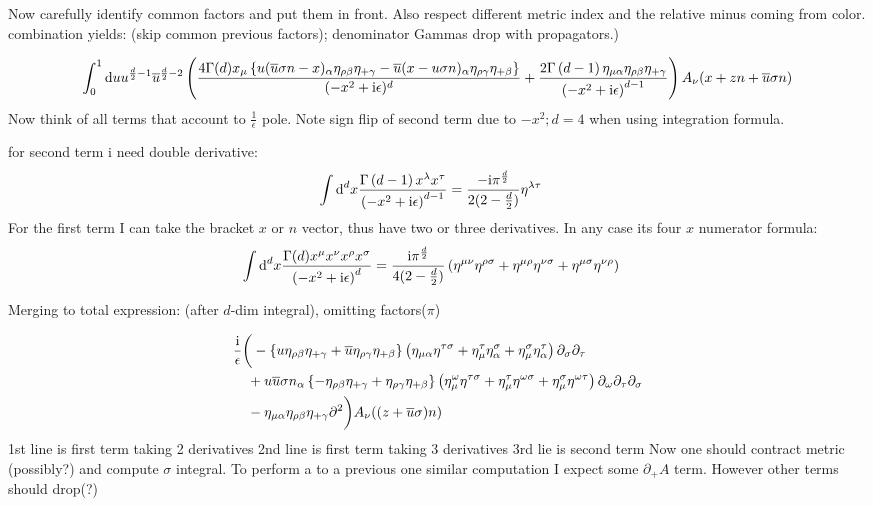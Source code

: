 Now carefully identify common factors and put them in front. Also respect different metric index and the relative minus coming from color. combination yields: (skip common previous factors); denominator Gammas drop with propagators.)


\begin{align}
	\int_{0}^{1} \text{d} u u^{\frac{d}{2}-1} \overline u^{\frac{d}{2}-2} \left( \frac{4\Gamma(d)x_\mu\left\{u (\overline u \sigma n -x )_\alpha \eta_{\rho\beta} \eta_{+\gamma} -\overline u (x - u\sigma n)_\alpha \eta_{\rho \gamma}\eta_{+\beta} \right\}}{(-x^2+\text{i}\epsilon)^{d}} +\frac{2\Gamma\left( d-1 \right) \eta_{\mu \alpha} \eta_{\rho \beta}\eta_{+\gamma} }{\left(-x^2+\text{i} \epsilon\right)^{d-1}}\right)A_{\nu}(x+zn+\overline u \sigma n)
\end{align}
Now think of all terms that account to $\frac{1}{\epsilon}$ pole. Note sign flip of second term due to $-x^2; d=4$ when using integration formula. 

for second term i need double derivative:
\begin{align}
	\int \text{d} ^d  x \frac{\Gamma\left( d-1 \right) x^\lambda x^\tau}{\left(-x^2+\text{i} \epsilon\right)^{d-1}}
	&=
	\frac{-\text{i} \pi^{\frac{d}{2}}}{2(2-\frac{d}{2})}\eta^{\lambda\tau}
\end{align}
For the first term I can take the bracket $x$ or $n$ vector, thus have two or three derivatives. In any case its four $x$ numerator formula:
\begin{align}
	\int \text{d} ^d  x \frac{\Gamma(d)x^\mu x^\nu x^\rho x^\sigma}{\left(-x^2+\text{i} \epsilon\right)^{d}}
	&=
	\frac{\text{i} \pi^{\frac{d}{2}}}{4(2-\frac{d}{2})}\left(\eta^{\mu\nu}\eta^{\rho \sigma} + \eta^{\mu \rho} \eta^{\nu \sigma} +\eta^{\mu \sigma}\eta^{\nu \rho}\right)	
\end{align}

Merging to total expression: (after $d$-dim integral), omitting factors($\pi$)

\begin{align}
	&\frac{\text{i}}{\epsilon}\bigg( - \left\{ u  \eta_{\rho\beta} \eta_{+\gamma} +\overline u  \eta_{\rho \gamma}\eta_{+\beta} \right\}\left(\eta_{\mu\alpha}\eta^{\tau \sigma} + \eta_\mu^{\tau} \eta_\alpha^{ \sigma} +\eta_\mu^{ \sigma}\eta_\alpha^{ \tau}\right)\partial_{\sigma}\partial_{\tau} 
	\\&~~~
	+u\overline u\sigma n_\alpha\left\{ -   \eta_{\rho\beta} \eta_{+\gamma} + \eta_{\rho \gamma}\eta_{+\beta} \right\}\left(\eta_\mu^{\omega}\eta^{\tau \sigma} + \eta_\mu^{ \tau} \eta^{\omega \sigma} +\eta_\mu^{ \sigma}\eta^{\omega \tau}\right) \partial_\omega\partial_\tau\partial_\sigma
	\\&~~~
	- \eta_{\mu \alpha} \eta_{\rho \beta}\eta_{+\gamma}\partial^2 \bigg)A_{\nu}((z+\overline u \sigma) n)
\end{align}
1st line is first term taking 2 derivatives
2nd line is first term taking 3 derivatives
3rd lie is second term
Now one should contract metric (possibly?) and compute $\sigma$ integral. To perform a to a previous one similar computation I expect some $\partial_+ A$ term. However other terms should drop(?)


